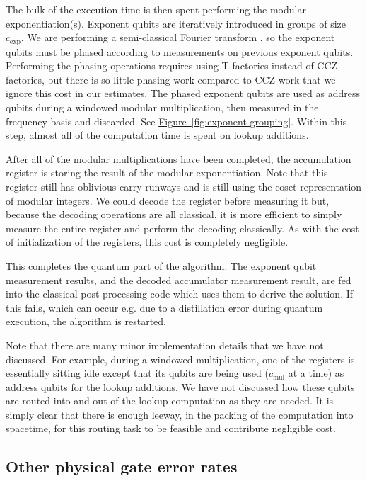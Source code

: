 \documentclass[a4paper, onecolumn, accepted=2021-03-29]{quantumarticle}
\newcommand{\fig}[1]{\hyperref[fig:#1]{Figure~\ref*{fig:#1}}}
\newcommand{\gexp}{{c_{\text{exp}}}}
\newcommand{\gmul}{{c_{\text{mul}}}}
\begin{document}
The bulk of the execution time is then spent performing the modular exponentiation(s).
Exponent qubits are iteratively introduced in groups of size $\gexp$.
We are performing a semi-classical Fourier transform \cite{griffiths1996semiclassical}, so the exponent qubits must be phased according to measurements on previous exponent qubits.
Performing the phasing operations requires using T factories instead of CCZ factories, but there is so little phasing work compared to CCZ work that we ignore this cost in our estimates.
The phased exponent qubits are used as address qubits during a windowed modular multiplication, then measured in the frequency basis and discarded.
See \fig{exponent-grouping}.
Within this step, almost all of the computation time is spent on lookup additions.

After all of the modular multiplications have been completed, the accumulation register is storing the result of the modular exponentiation.
Note that this register still has oblivious carry runways and is still using the coset representation of modular integers.
We could decode the register before measuring it but, because the decoding operations are all classical, it is more efficient to simply measure the entire register and perform the decoding classically.
As with the cost of initialization of the registers, this cost is completely negligible.

This completes the quantum part of the algorithm.
The exponent qubit measurement results, and the decoded accumulator measurement result, are fed into the classical post-processing code which uses them to derive the solution.
If this fails, which can occur e.g. due to a distillation error during quantum execution, the algorithm is restarted.

Note that there are many minor implementation details that we have not discussed.
For example, during a windowed multiplication, one of the registers is essentially sitting idle except that its qubits are being used ($\gmul$ at a time) as address qubits for the lookup additions.
We have not discussed how these qubits are routed into and out of the lookup computation as they are needed.
It is simply clear that there is enough leeway, in the packing of the computation into spacetime, for this routing task to be feasible and contribute negligible cost.


\subsection{Other physical gate error rates}
\end{document}

